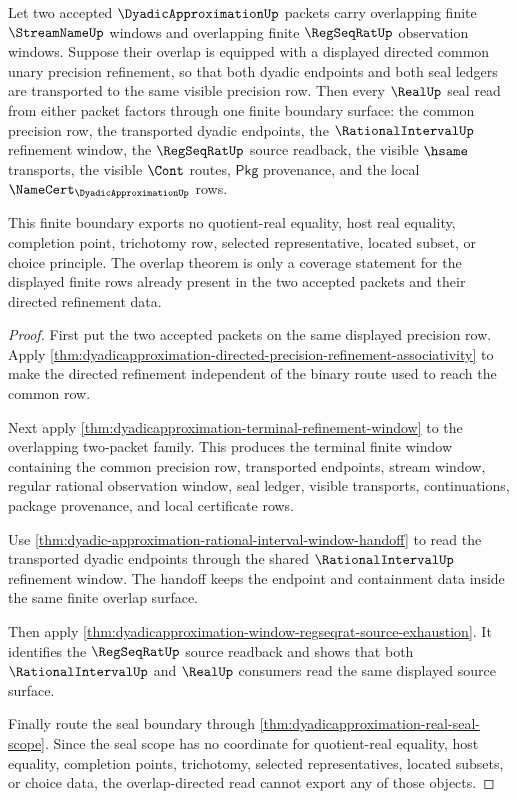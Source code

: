 \begin{theorem}\label{thm:dyadicapproximation-overlap-directed-seal-exhaustion}
Let two accepted $\DyadicApproximationUp$ packets carry overlapping finite
$\StreamNameUp$ windows and overlapping finite $\RegSeqRatUp$ observation
windows. Suppose their overlap is equipped with a displayed directed common
unary precision refinement, so that both dyadic endpoints and both seal
ledgers are transported to the same visible precision row. Then every
$\RealUp$ seal read from either packet factors through one finite boundary
surface: the common precision row, the transported dyadic endpoints, the
$\RationalIntervalUp$ refinement window, the $\RegSeqRatUp$ source readback,
the visible $\hsame$ transports, the visible $\Cont$ routes, $\mathsf{Pkg}$
provenance, and the local $\NameCert_{\DyadicApproximationUp}$ rows.

This finite boundary exports no quotient-real equality, host real equality,
completion point, trichotomy row, selected representative, located subset, or
choice principle. The overlap theorem is only a coverage statement for the
displayed finite rows already present in the two accepted packets and their
directed refinement data.
\end{theorem}
\begin{proof}
First put the two accepted packets on the same displayed precision row. Apply
\autoref{thm:dyadicapproximation-directed-precision-refinement-associativity}
to make the directed refinement independent of the binary route used to reach
the common row.

Next apply \autoref{thm:dyadicapproximation-terminal-refinement-window} to the
overlapping two-packet family. This produces the terminal finite window
containing the common precision row, transported endpoints, stream window,
regular rational observation window, seal ledger, visible transports,
continuations, package provenance, and local certificate rows.

Use \autoref{thm:dyadic-approximation-rational-interval-window-handoff} to
read the transported dyadic endpoints through the shared
$\RationalIntervalUp$ refinement window. The handoff keeps the endpoint and
containment data inside the same finite overlap surface.

Then apply
\autoref{thm:dyadicapproximation-window-regseqrat-source-exhaustion}. It
identifies the $\RegSeqRatUp$ source readback and shows that both
$\RationalIntervalUp$ and $\RealUp$ consumers read the same displayed source
surface.

Finally route the seal boundary through
\autoref{thm:dyadicapproximation-real-seal-scope}. Since the seal scope has no
coordinate for quotient-real equality, host equality, completion points,
trichotomy, selected representatives, located subsets, or choice data, the
overlap-directed read cannot export any of those objects.
\end{proof}

